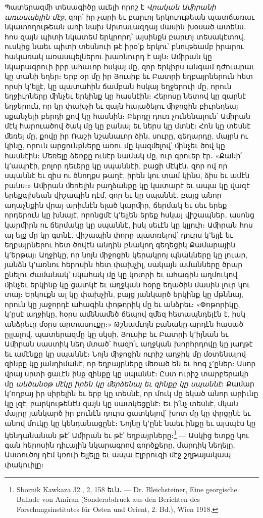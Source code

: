\documentclass{article}
\begin{document}
{Պատերազﬕ տեսագիծը աւելի որոշ է \emph{Վրական Աﬕրանի առասպելին մէջ}, զոր՝ իր չարի եւ բարւոյ երկուութեան պատճառաւ նկատողութեան առի նախ Արտաւազդայ մասին խօսած ատենս․ հոս զայն պիտի նկատեմ երկրորդ՝ այսինքն բարւոյ տեսակէտով, ուսկից նաեւ պիտի տեսնուի թէ իրօ՛ք երկու՝ բնութեամբ իրարու հակառակ առասպելներու խառնուրդ է այն։ Աﬕրան կը նկարագրուի իբր ահաւոր հսկայ մը, զոր երկիրս անգամ դժուարաւ կը տանի եղեր։ Երբ օր մը իր Յուսիբ եւ Բատրի եղբայրներուն հետ որսի կ՚ելլէ, կը պատահին ճամբան հսկայ եղջերուի մը, որուն եղջիւրները ﬕնչեւ երկինք կը հասնէին։ Հերոսը նետով կը զարնէ եղջերուն, որ կը փախչի եւ զայն հալածելու ﬕջոցին բիւրեղեայ սքանչելի բերդի քով կը հասնին։ Բերդը դուռ չունենալուն՝ Աﬕրան մէկ հարուածով ծակ մը կը բանայ եւ ներս կը մտնէ։ Հոն կը տեսնէ ﬔռել մը, քովը իր Ռաշի նշանաւոր ձին, սուրը, գեղարդը, մայրն ու կինը, որուն արցունքները առու մը կազﬔլով՝ ﬕնչեւ ծով կը հասնէին։ Մեռելը ձեռքը ունէր նամակ մը, ուր գրուեր էր․ «Քանի՛ կ՚ապրէի, բոլոր դեւերը կը սպաննէի, բացի մէկէն․ զոր ով որ սպաննէ եւ զիս ու ծնողքս թաղէ, իրեն կու տամ կինս, ձիս եւ ամէն բանս։» Աﬕրան ﬔռելին բաղձանքը կը կատարէ եւ ապա կը վազէ երեքգլխեան վիշապին դէմ, զոր եւ կը սպաննէ, բայց անոր աղաչնքին վրայ արիւնէն ելած կարﬕր, ճերմակ եւ սեւ երեք որդերուն կը խնայէ, որոնցմէ կ՚ելլեն երեք հսկայ վիշապներ․ ասոնց կարﬕրն ու ճերմակը կը սպաննէ, իսկ սեւէն կը կլլուի։ Աﬕրան հոս ալ ելք մը կը գտնէ․ վիշապին փորը պատռելով՝ դուրս կ՚ելլէ եւ եղբայրներու հետ ծովէն անդին բնակող գեղեցիկ Քամարային կ՚երթայ։ Աղջիկը, որ նոյն ﬕջոցին կերակրոյ պնակները կը լուար, յանձն կ՚առնու հերոսին հետ փախչիլ, սակայն ամանները ծրար ընելու ժամանակ՝ սկահակ մը կը կոտրի եւ ահագին աղմուկով ﬕնչեւ երկինք կը ցատկէ եւ աղջկան հօրը եղածին մասին լուր կու տայ։ Երկուքն ալ կը փախչին, բայց յանկարծ երկինք կը մթննայ, որուն կը յաջորդէ ահագին փոթորիկ մը եւ անձրեւ։ «Փոթորիկը, կ՚ըսէ աղջիկը, հօրս աﬔնաﬔծ ճեպով զﬔզ հետապնդելէն է, իսկ անձրեւը մօրս արտասուքը։» Թշնամւոյն բանակը արդէն հասած ըլլալով, պատերազմը կը սկսի, Յուսիբ եւ Բատրի կ՚իյնան եւ Աﬕրան սաստիկ նեղ մտած՝ հազի՛ւ աղջկան խորհրդովը կը յաղթէ եւ ամէնքը կը սպաննէ։ Նոյն ﬕջոցին ուրիշ աղջիկ մը մօտենալով զինքը կը յանդիմանէ, որ եղբայրները ﬔռած են եւ հոգ չ՚ըներ։ Ասոր վրայ սրտի ցաւէն ինք զինքը կը սպաննէ։ Ըստ ուրիշ տարբերակի մը \emph{անծանօթ մէկը իրեն կը ﬔրձենայ եւ զինքը կը սպաննէ}։ Քամար կ՚ողբայ իր սիրելին եւ երբ կը տեսնէ, որ մուկ մը եկած անոր արիւնը կը լզէ, բարկութենէն զայն կը սատկեցընէ։ Եւ ի՛նչ տեսնէ, մկան մայրը յանկարծ իր բունէն դուրս ցատկելով՝ խոտ մը կը փրցընէ եւ անով մուկը կը կենդանացընէ։ Նոյնը կ՚ընէ նաեւ ինքը եւ այսպէս կը կենդանանան թէ՛ Աﬕրան եւ թէ՛ եղբայրները։\footnote{Sbornik Kawkaza 32., 2, 158 եւն․ — Dr. Bleichsteiner, Eine georgische Ballade von Amiran (Sonderabdruck aus den Berichten des Forschungsinstitutes für Osten und Orient, 2. Bd.), Wien 1918.} — Ասկից ետքը կու գան հերոսին դիւային նկարագրով գործքերը, մարդիկ նեղելը, Աստուծոյ դէմ կռուի ելլելը եւ ապա Էլբրուզի մէջ շղթայակապ փակուիլը։

}
\end{document}
